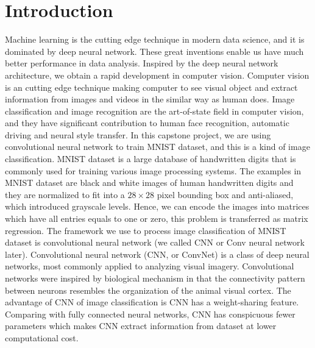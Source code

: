 \documentclass[12pt]{article}
\begin{document}
\section{Introduction}
Machine learning is the cutting edge technique in modern data science, and it is dominated by deep neural network. These great inventions enable us have much better performance in data analysis. Inspired by the deep neural network architecture, we obtain a rapid development in computer vision. Computer vision is an cutting edge technique making computer to see visual object and extract information from images and videos in the similar way as human does. Image classification and image recognition are the art-of-state field in computer vision, and they have significant contribution to human face recognition, automatic driving and neural style transfer. In this capstone project, we are using convolutional neural network to train MNIST dataset, and this is a kind of image classification. MNIST dataset is a large database of handwritten digits that is commonly used for training various image processing systems. The examples in MNIST dataset are black and white images of human handwritten digits and they are normalized to fit into a $28 \times 28$ pixel bounding box and anti-aliased, which introduced grayscale levels. Hence, we can encode the images into matrices which have all entries equals to one or zero, this problem is transferred as matrix regression. The framework we use to process image classification of MNIST dataset is convolutional neural network (we called CNN or Conv neural network later). Convolutional neural network (CNN, or ConvNet) is a class of deep neural networks, most commonly applied to analyzing visual imagery. Convolutional networks were inspired by biological mechanism in that the connectivity pattern between neurons resembles the organization of the animal visual cortex. The advantage of CNN of image classification is CNN has a weight-sharing feature. Comparing with fully connected neural networks, CNN has conspicuous fewer parameters which makes CNN extract information from dataset at lower computational cost. \\
~\\
\end{document}
